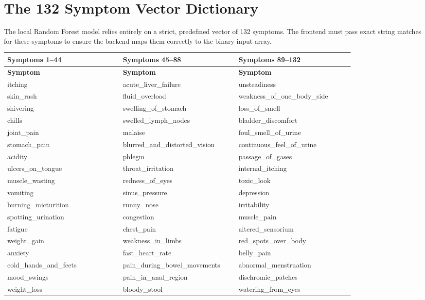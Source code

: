 \section{The 132 Symptom Vector Dictionary}

The local Random Forest model relies entirely on a strict, predefined vector of 132 symptoms. The frontend must pass exact string matches for these symptoms to ensure the backend maps them correctly to the binary input array.

\begin{longtable}{|p{0.3\linewidth}|p{0.3\linewidth}|p{0.3\linewidth}|}
\hline
\textbf{Symptoms 1--44} & \textbf{Symptoms 45--88} & \textbf{Symptoms 89--132} \\ \hline
\endfirsthead
\hline
\textbf{Symptom} & \textbf{Symptom} & \textbf{Symptom} \\ \hline
\endhead
itching & acute\_liver\_failure & unsteadiness \\
skin\_rash & fluid\_overload & weakness\_of\_one\_body\_side \\
shivering & swelling\_of\_stomach & loss\_of\_smell \\
chills & swelled\_lymph\_nodes & bladder\_discomfort \\
joint\_pain & malaise & foul\_smell\_of\_urine \\
stomach\_pain & blurred\_and\_distorted\_vision & continuous\_feel\_of\_urine \\
acidity & phlegm & passage\_of\_gases \\
ulcers\_on\_tongue & throat\_irritation & internal\_itching \\
muscle\_wasting & redness\_of\_eyes & toxic\_look \\
vomiting & sinus\_pressure & depression \\
burning\_micturition & runny\_nose & irritability \\
spotting\_urination & congestion & muscle\_pain \\
fatigue & chest\_pain & altered\_sensorium \\
weight\_gain & weakness\_in\_limbs & red\_spots\_over\_body \\
anxiety & fast\_heart\_rate & belly\_pain \\
cold\_hands\_and\_feets & pain\_during\_bowel\_movements & abnormal\_menstruation \\
mood\_swings & pain\_in\_anal\_region & dischromic\_patches \\
weight\_loss & bloody\_stool & watering\_from\_eyes \\

\end{longtable}
